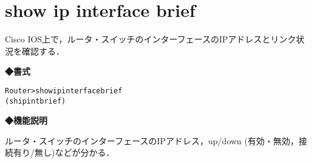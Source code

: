\clearpage

\section{show ip interface brief}
\label{cmd:ios-show-ip-int-brief}
Cisco IOS上で，ルータ・スイッチのインターフェースのIPアドレスとリンク状況を確認する．

\noindent
{\bf ◆書式}
\begin{center}
\begin{screen}
\begin{alltt}
Router>show ip interface brief
        (sh ip int brief)

\end{alltt}
\end{screen}
\end{center}


{\bf ◆機能説明}

ルータ・スイッチのインターフェースのIPアドレス，up/down (有効・無効，接続有り/無し)などが分かる．



